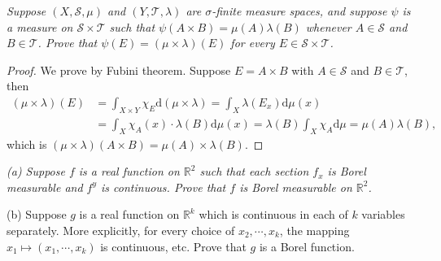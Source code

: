 \begin{problem}\em
Suppose $(X,\mathscr{S},\mu)$ and $(Y,\mathscr{T},\lambda)$ are $\sigma$-finite measure spaces, and suppose $\psi$ is a measure on $\mathscr{S}\times\mathscr{T}$ such that $\psi(A\times B)=\mu(A)\lambda(B)$ whenever $A\in\mathscr{S}$ and $B\in\mathscr{T}$. Prove that $\psi(E)=(\mu\times\lambda)(E)$ for every $E\in\mathscr{S}\times\mathscr{T}$. 
\end{problem}
\begin{proof}
We prove by Fubini theorem. Suppose $E=A\times B$ with $A\in\mathscr{S}$ and $B\in\mathscr{T}$, then 
$$
\begin{aligned}
\left( \mu \times \lambda \right) \left( E \right) &=\int_{X\times Y}{\chi _E\mathrm{d}\left( \mu \times \lambda \right)}=\int_X{\lambda \left( E_x \right) \mathrm{d}\mu \left( x \right)}
\\
&=\int_X{\chi _A\left( x \right) \cdot \lambda \left( B \right) \mathrm{d}\mu \left( x \right)}=\lambda \left( B \right) \int_X{\chi _A\mathrm{d}\mu}=\mu \left( A \right) \lambda \left( B \right) ,
\end{aligned}
$$
which is $(\mu\times\lambda)(A\times B)=\mu(A)\times\lambda(B)$.
\end{proof}
\begin{problem}\em
(a) Suppose $f$ is a real function on $\mathbb{R}^2$ such that each section $f_x$ is Borel measurable and $f^y$ is continuous. Prove that $f$ is Borel measurable on $\mathbb{R}^2$.\par
(b) Suppose $g$ is a real function on $\mathbb{R}^k$ which is continuous in each of $k$ variables separately. More explicitly, for every choice of $x_2,\cdots,x_k$, the mapping $x_1\mapsto(x_1,\cdots,x_k)$ is continuous, etc. Prove that $g$ is a Borel function.
\end{problem}

